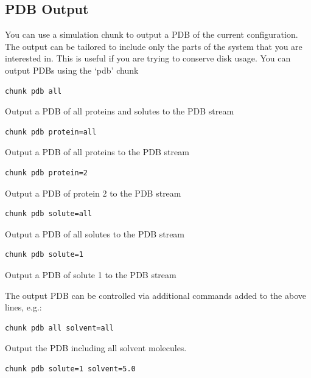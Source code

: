 \documentclass[letterpaper,10pt,english]{sphinxmanual}
\begin{document}
\subsection{PDB Output}
\label{protoms:pdb-output}
You can use a simulation chunk to output a PDB of the current configuration. The output can be tailored to include only the parts of the system that you are interested in. This is useful if you are trying to conserve disk usage. You can output PDBs using the ‘pdb’ chunk

\begin{Verbatim}[commandchars=\\\{\}]
chunk pdb all
\end{Verbatim}

Output a PDB of all proteins and solutes to the PDB stream

\begin{Verbatim}[commandchars=\\\{\}]
chunk pdb protein=all
\end{Verbatim}

Output a PDB of all proteins to the PDB stream

\begin{Verbatim}[commandchars=\\\{\}]
chunk pdb protein=2
\end{Verbatim}

Output a PDB of protein 2 to the PDB stream

\begin{Verbatim}[commandchars=\\\{\}]
chunk pdb solute=all
\end{Verbatim}

Output a PDB of all solutes to the PDB stream

\begin{Verbatim}[commandchars=\\\{\}]
chunk pdb solute=1
\end{Verbatim}

Output a PDB of solute 1 to the PDB stream

The output PDB can be controlled via additional commands added to the above lines, e.g.:

\begin{Verbatim}[commandchars=\\\{\}]
chunk pdb all solvent=all
\end{Verbatim}

Output the PDB including all solvent molecules.

\begin{Verbatim}[commandchars=\\\{\}]
chunk pdb solute=1 solvent=5.0
\end{Verbatim}
\end{document}
